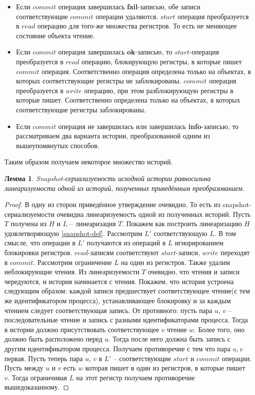 \documentclass[pdftex,ptm,14pt,a4paper]{extreport}
\newtheorem{lemma}[theorem]{Лемма}
\theoremstyle{definition}
\begin{document}
\begin{itemize}
    \item Если $commit$ операция завершилась \textbf{fail}-записью, обе записи
        соответствующие $commit$ операции удаляются.
        $start$ операция преобразуется в $read$ операцию для того-же множества регистров.
        То есть не меняющее состояние объекта чтение.
    \item Если $commit$ операция завершилась \textbf{ok}-записью, то
        $start$-операция преобразуется в $read$ операцию, блокирующую регистры,
        в которые пишет $commit$ операция. Соответственно операция определена только на объектах,
        в которых соответствующие регистры не заблокированы. $commit$ операция преобразуется в
        $write$ операцию, при этом разблокирующую регистры в которые пишет.
        Соответственно определена только на объектах, в которых соответствующие регистры заблокированы.
    \item Если $commit$ операция не завершилась или завершилась \textbf{info}-записью, то рассматриваем два варианта истории,
        преобразованной одним из вышеупомянутых способов.
\end{itemize}

Таким образом получаем некоторое множество историй.
\begin{lemma}
    Snapshot-сериализуемость исходной истории равносильна линеаризуемости одной из историй, полученных
    приведённым преобразованием.
\end{lemma}
\begin{proof}
    В одну из сторон приведённое утверждение очевидно. То есть из snapshot-сериализуемости очевидна линеаризуемость
    одной из полученных историй. Пусть $T$ получена из $H$ и $L$ -- линеаризация $T.$ Покажем как построить линеаризацию
    $H$ удовлетворяющую \ref{snapshot-def}. Рассмотрим $L'$ соответствующую $L.$ В том смысле, что операции в $L'$ получаются
    из операций в $L$ игнорированием блокировки регистров. $read$-записям соответствуют $start$-записи,
    $write$ переходят в $commit$. Рассмотрим ограничение $L$ на один из регистров. Также удалим неблокирующие чтения.
    Из линеаризуемости $T$ очевидно, что чтения и записи чередуются, и история начинается с чтения.
    Покажем, что история устроена следующим образом: каждой записи предшествует соответствующее чтение(с тем же идентификатором
    процесса), устанавливающее блокировку и за каждым чтением следует соответствующая запись. От противного: пусть пара $u$, $v$
    -- последовательные чтение и запись с разными идентификаторами процесса. Тогда в истории должно присутствовать соответствующее
    $v$ чтение $w$. Более того, оно должно быть расположено перед $u.$ Тогда после него должна быть запись с другим идентификатором
    процесса. Получаем противоречие с тем что пара $u, v$ первая. Пусть теперь пара $u$, $v$ в $L'$ -- соответствующие $start$ и
    $commit$ операции. Пусть между $u$ и $v$ есть $w$ которая пишет в один из регистров, в которые пишет $v.$ Тогда ограничивая $L$ на
    этот регистр получаем противоречие вышедоказанному.
\end{proof}
\end{document}

